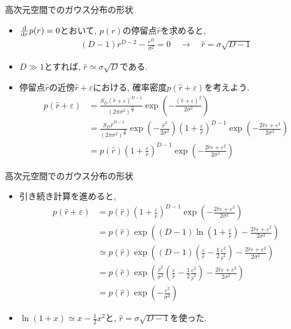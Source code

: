 \documentclass[dvipdfmx,notheorems,t]{beamer}
\begin{document}
\begin{frame}{高次元空間でのガウス分布の形状}
\begin{itemize}
  \item $\dv{r} p(r) = 0$とおいて, $p(r)$の停留点$\hat{r}$を求めると,
  \begin{align*}
    (D - 1) r^{D - 2} - \frac{r^D}{\sigma^2} = 0 \quad \longrightarrow \quad
    \hat{r} = \sigma \sqrt{D - 1}
  \end{align*}

  \item $D \gg 1$とすれば, $\hat{r} \simeq \sigma \sqrt{D}$である.
  \item 停留点$\hat{r}$の近傍$\hat{r} + \varepsilon$における, 確率密度$p(\hat{r} + \varepsilon)$を考えよう.
  \begin{align*}
    p(\hat{r} + \varepsilon) &= \frac{S_D (\hat{r} + \varepsilon)^{D - 1}}{(2\pi \sigma^2)^\frac{D}{2}}
      \exp(-\frac{(\hat{r} + \varepsilon)^2}{2 \sigma^2}) \\
      &= \frac{S_D \hat{r}^{D - 1}}{(2\pi \sigma^2)^\frac{D}{2}}
        \exp(-\frac{\hat{r}^2}{2 \sigma^2}) \left( 1 + \frac{\varepsilon}{\hat{r}} \right)^{D - 1}
        \exp(-\frac{2 \hat{r} \varepsilon + \varepsilon^2}{2 \sigma^2}) \\
      &= p(\hat{r}) \left( 1 + \frac{\varepsilon}{\hat{r}} \right)^{D - 1}
        \exp(-\frac{2 \hat{r} \varepsilon + \varepsilon^2}{2 \sigma^2})
  \end{align*}
\end{itemize}
\end{frame}

\begin{frame}{高次元空間でのガウス分布の形状}
\begin{itemize}
  \item 引き続き計算を進めると,
  \begin{align*}
    p(\hat{r} + \varepsilon) &= p(\hat{r}) \left( 1 + \frac{\varepsilon}{\hat{r}} \right)^{D - 1}
      \exp(-\frac{2 \hat{r} \varepsilon + \varepsilon^2}{2 \sigma^2}) \\
      &= p(\hat{r}) \exp((D - 1) \ln(1 + \frac{\varepsilon}{\hat{r}})
        - \frac{2 \hat{r} \varepsilon + \varepsilon^2}{2 \sigma^2}) \\
      &\simeq p(\hat{r}) \exp((D - 1) \left( \frac{\varepsilon}{\hat{r}}
        - \frac{1}{2} \frac{\varepsilon^2}{\hat{r}^2} \right)
        - \frac{2 \hat{r} \varepsilon + \varepsilon^2}{2 \sigma^2}) \\
      &= p(\hat{r}) \exp(\frac{\hat{r}^2}{\sigma^2} \left( \frac{\varepsilon}{\hat{r}}
        - \frac{1}{2} \frac{\varepsilon^2}{\hat{r}^2} \right)
        - \frac{2 \hat{r} \varepsilon + \varepsilon^2}{2 \sigma^2}) \\
      &= p(\hat{r}) \exp(-\frac{\varepsilon^2}{\sigma^2})
  \end{align*}

  \item $\ln(1 + x) \simeq x - \frac{1}{2} x^2$と, $\hat{r} = \sigma \sqrt{D - 1}$を使った.
\end{itemize}
\end{frame}
\end{document}
